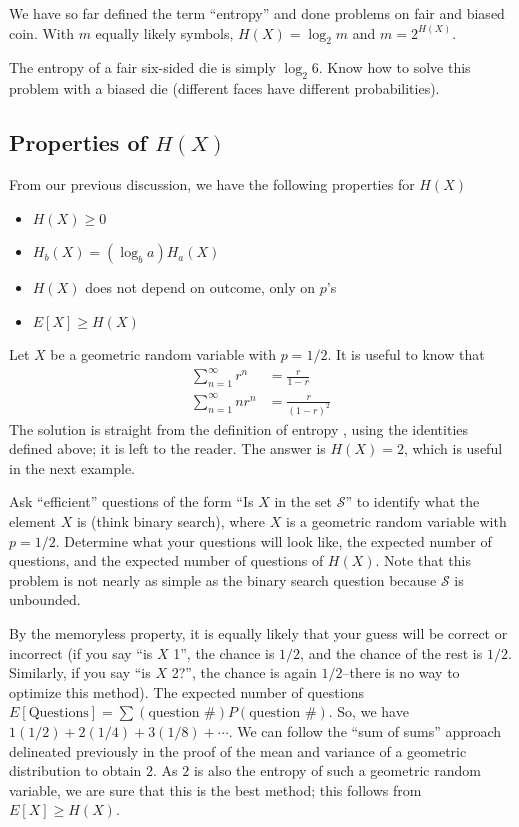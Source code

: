 \documentclass[11pt]{article}
\theoremstyle{definition}
\begin{document}
We have so far defined the term ``entropy'' and done problems on fair and biased coin. With $m$ equally likely symbols, $H(X) = \log_2 m$ and $m = 2^{H(X)}$. 

\example The entropy of a fair six-sided die is simply $\log_2 6$. Know how to solve this problem with a biased die (different faces have different probabilities). 

\subsection{Properties of $H(X)$}

From our previous discussion, we have the following properties for $H(X)$
\begin{itemize}
\item $H(X) \geq 0$
\item $H_b(X) = (\log_b a) H_a(X)$
\item $H(X)$ does not depend on outcome, only on $p$'s
\item $E[X] \geq H(X)$
\end{itemize}

\example Let $X$ be a geometric random variable with $p = 1/2$. It is useful to know that
\begin{align*}
\sum_{n=1}^\infty r^n &= \frac{r}{1-r} \\
\sum_{n=1}^\infty nr^n &= \frac{r}{(1-r)^2}
\end{align*}
The solution is straight from the definition of entropy , using the identities defined above; it is left to the reader. The answer is $H(X) = 2$, which is useful in the next example.  

\example Ask ``efficient'' questions of the form ``Is $X$ in the set $\mathcal{S}$'' to identify what the element $X$ is (think binary search), where $X$ is a geometric random variable with $p = 1/2$. Determine what your questions will look like, the expected number of questions, and the expected number of questions of $H(X)$. Note that this problem is not nearly as simple as the binary search question because $\mathcal{S}$ is unbounded. 

By the memoryless property, it is equally likely that your guess will be correct or incorrect (if you say ``is $X$ 1'', the chance is $1/2$, and the chance of the rest is $1/2$. Similarly, if you say ``is $X$ 2?'', the chance is again $1/2$--there is no way to optimize this method). The expected number of questions $E[\text{Questions}] = \sum(\text{question \#})P(\text{question \#})$. So, we have $1(1/2) + 2(1/4) + 3(1/8) + \cdots$. We can follow the ``sum of sums'' approach delineated previously in the proof of the mean and variance of a geometric distribution to obtain $2$. As $2$ is also the entropy of such a geometric random variable, we are sure that this is the best method; this follows from $E[X] \geq H(X)$. 
\end{document}
